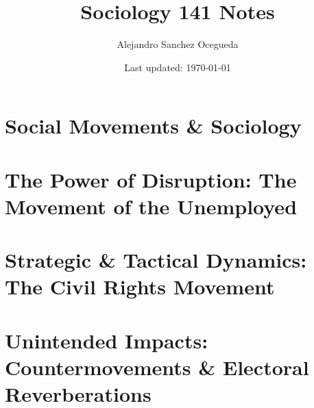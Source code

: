 \documentclass{book}
\title{Sociology 141 Notes}
\author{Alejandro Sanchez Ocegueda}
\date{Last updated: \today}
\begin{document}
\maketitle

\chapter{Social Movements \& Sociology}

\chapter{The Power of Disruption: The Movement of the Unemployed}

\chapter{Strategic \& Tactical Dynamics: The Civil Rights Movement}

\chapter{Unintended Impacts: Countermovements \& Electoral Reverberations}
\end{document}
